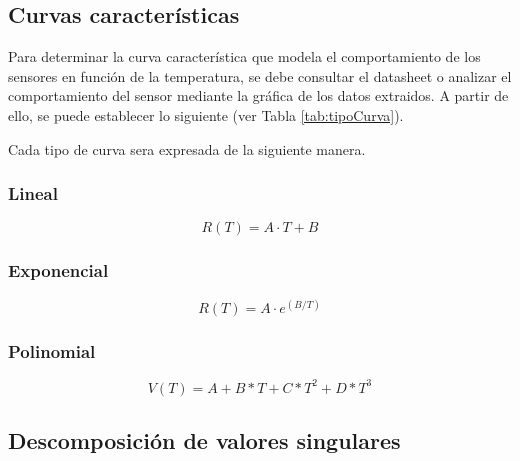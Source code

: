 \documentclass[conference]{IEEEtran}
\begin{document}
\subsection{Curvas caracter\'isticas}

Para determinar la curva caracter\'istica que modela el comportamiento de los sensores en funci\'on de la temperatura, se debe consultar el datasheet o analizar el comportamiento del sensor mediante la gr\'afica de los datos extraidos. A partir de ello, se puede establecer lo siguiente (ver Tabla \ref{tab:tipoCurva}).

\begin{table}[h]
	\centering
	\caption{Tipo de curva}
	\label{tab:tipoCurva}
	
\end{table}

Cada tipo de curva sera expresada de la siguiente manera.

\subsubsection{Lineal}

\[
R(T) = A \cdot T + B
\]

\subsubsection{Exponencial}
\[
R(T) = A \cdot e^{(B/T)}
\]

\subsubsection{Polinomial}
\[
V(T) = A + B * T + C * T^2 + D * T^3
\]

\subsection{Descomposici\'on de valores singulares}
\end{document}
